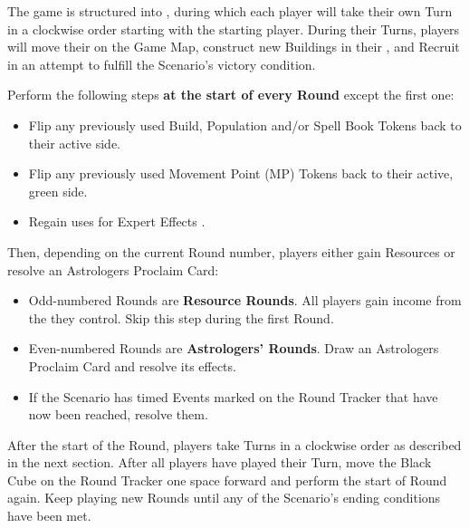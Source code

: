 
\begin{multicols*}{2}

The game is structured into , during which each player will take their own Turn in a clockwise order starting with the starting player.
During their Turns, players will move their  on the Game Map, construct new Buildings in their , and Recruit  in an attempt to fulfill the Scenario's victory condition.\par
Perform the following steps \textbf{at the start of every Round} except the first one:
\begin{itemize}
  \item Flip any previously used Build, Population and/or Spell Book Tokens back to their active side.
  \item Flip any previously used Movement Point (MP) Tokens back to their active, green side.
  \item Regain uses for Expert Effects .
\end{itemize}
Then, depending on the current Round number, players either gain Resources or resolve an Astrologers Proclaim Card:
\begin{itemize}
  \item Odd-numbered Rounds are \textbf{Resource Rounds}.
    All players gain income from the  they control.
    Skip this step during the first Round.
  \item Even-numbered Rounds are \textbf{Astrologers' Rounds}.
    Draw an Astrologers Proclaim Card and resolve its effects.
  \item If the Scenario has timed Events marked on the Round Tracker that have now been reached, resolve them.
\end{itemize}
After the start of the Round, players take Turns in a clockwise order as described in the next section.
After all players have played their Turn, move the Black Cube on the Round Tracker one space forward and perform the start of Round again.
Keep playing new Rounds until any of the Scenario's ending conditions have been met.

\vspace*{\fill}

\vspace*{-4em}

\vspace*{\fill}


\end{multicols*}
